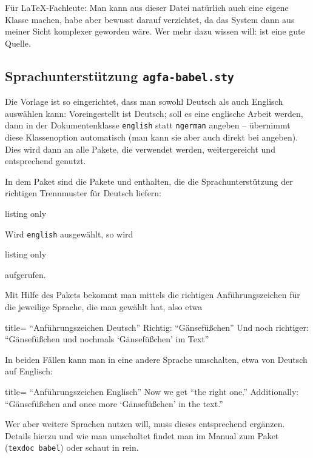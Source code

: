 Für \LaTeX-Fachleute: Man kann aus dieser Datei natürlich auch eine eigene Klasse machen, habe aber bewusst darauf verzichtet, da das System dann aus meiner Sicht komplexer geworden wäre. 
Wer mehr dazu wissen will: \textcite{goossen:2005} ist eine gute Quelle.
%
\subsection{Sprachunterstützung \texttt{agfa-babel.sty}}\label{subsec:babel}
%
Die Vorlage ist so eingerichtet, dass man sowohl Deutsch als auch Englisch auswählen kann: Voreingestellt ist Deutsch; soll es eine englische Arbeit werden, dann in der Dokumentenklasse \texttt{english} statt \texttt{ngerman} angeben --  übernimmt diese Klassenoption automatisch (man kann sie aber auch direkt bei  angeben).
Dies wird dann an alle Pakete, die verwendet werden, weitergereicht und entsprechend genutzt.

In dem \og Paket sind die Pakete  und  enthalten, die die Sprachunterstützung \inkl der richtigen Trennmuster für Deutsch liefern:
%
\begin{tcblisting}{listing only}
\RequirePackage[english,main=ngerman]{babel}
\RequirePackage[german=guillemets]{csquotes}
\end{tcblisting}
%
Wird \texttt{english} ausgewählt, so wird 
%
\begin{tcblisting}{listing only}
\RequirePackage[ngerman,main=english]{babel}
\RequirePackage[english=american]{csquotes}
\end{tcblisting}
%
aufgerufen.

Mit Hilfe des Pakets  bekommt man mittels  die richtigen Anführungszeichen für die jeweilige Sprache, die man gewählt hat, also etwa
%
\begin{tcblisting}{title= \enquote{Anführungszeichen Deutsch}}
Richtig: \enquote{Gänsefüßchen}
Und noch richtiger: \enquote{Gänsefüßchen und nochmals \enquote{Gänsefüßchen} im Text}
\end{tcblisting}
%
In beiden Fällen kann man in eine andere Sprache umschalten, etwa von Deutsch auf Englisch:
%
\begin{otherlanguage}{english}
\begin{tcblisting}{title= \enquote{Anführungszeichen Englisch}}
Now we get \enquote{the right one.}
Additionally: \enquote{Gänsefüßchen and once more \enquote{Gänsefüßchen} in the text.}
\end{tcblisting}
\end{otherlanguage}
%
Wer aber weitere Sprachen nutzen will, muss dieses entsprechend ergänzen.
Details hierzu und wie man umschaltet findet man im Manual zum Paket  (\texttt{texdoc babel}) oder schaut in \textcite[3.7.2]{voss:2012a} rein.

